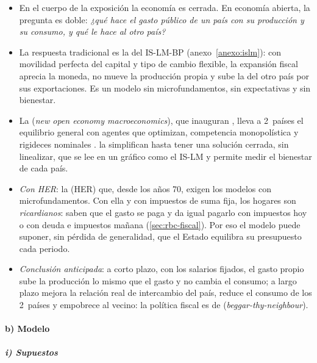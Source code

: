 \documentclass[11pt]{article}
\begin{document}
\begin{itemize}
\item En el cuerpo de la exposición la economía es cerrada. En economía abierta, la pregunta es doble: \emph{¿qué hace el gasto público de un país con su producción y su consumo, y qué le hace al otro país?}
\item La respuesta tradicional es la del IS-LM-BP (anexo~\ref{anexo:islm}): con movilidad perfecta del capital y tipo de cambio flexible, la expansión fiscal aprecia la moneda, no mueve la producción propia y sube la del otro país por sus exportaciones. Es un modelo sin microfundamentos, sin expectativas y sin bienestar.
\item La  (\emph{new open economy macroeconomics}), que inauguran \textcite{ObstfeldRogoff1995Redux}, lleva a 2~países el equilibrio general con agentes que optimizan, competencia monopolística y rigideces nominales . \textcite{CorsettiPesenti2001Welfare} la simplifican hasta tener una solución cerrada, sin linealizar, que se lee en un gráfico como el IS-LM y permite medir el bienestar de cada país.
\item \emph{Con HER}: la  (HER) que, desde los años 70, exigen los modelos con microfundamentos. Con ella y con impuestos de suma fija, los hogares son \emph{ricardianos}: saben que el gasto se paga y da igual pagarlo con impuestos hoy o con deuda e impuestos mañana (\ref{sec:rbc-fiscal}). Por eso el modelo puede suponer, sin pérdida de generalidad, que el Estado equilibra su presupuesto cada periodo.
\item \emph{Conclusión anticipada}: a corto plazo, con los salarios fijados, el gasto propio sube la producción lo mismo que el gasto y no cambia el consumo; a largo plazo mejora la relación real de intercambio del país, reduce el consumo de los 2~países y empobrece al vecino: la política fiscal es de  (\emph{beggar-thy-neighbour}).
\end{itemize}

\paragraph{b) Modelo}

\subparagraph{i) Supuestos}
\end{document}
